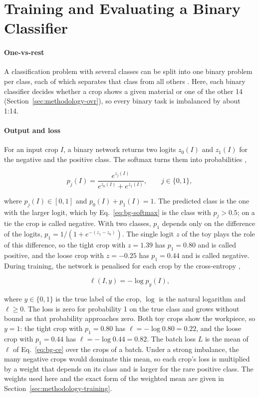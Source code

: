 \section{Training and Evaluating a Binary Classifier}
\label{sec:background-training}

\paragraph{One-vs-rest}
A classification problem with several classes can be split into one binary problem per
class, each of which separates that class from all others \citep{rifkin2004defense}.
Here, each binary classifier decides whether a crop shows a given material or one of the
other 14 (Section~\ref{sec:methodology-ovr}), so every binary task is imbalanced by
about 1:14.

\paragraph{Output and loss}
For an input crop $I$, a binary network returns two logits $z_0(I)$ and $z_1(I)$ for the
negative and the positive class. The softmax turns them into
probabilities \citep[Sec.~6.2.2.3]{goodfellow2016deep},

\begin{equation}
p_j(I) = \frac{e^{z_j(I)}}{e^{z_0(I)} + e^{z_1(I)}}, \qquad j \in \{0, 1\},
\label{eq:bg-softmax}
\end{equation}

where $p_j(I) \in [0,1]$ and $p_0(I) + p_1(I) = 1$. The predicted class is the one with
the larger logit, which by Eq.~\eqref{eq:bg-softmax} is the class with $p_j > 0.5$; on a
tie the crop is called negative. With two classes, $p_1$ depends only on the difference
of the logits, $p_1 = 1/(1 + e^{-(z_1 - z_0)})$. The single logit $z$ of the toy plays
the role of this difference, so the tight crop with $z = 1.39$ has $p_1 = 0.80$ and is
called positive, and the loose crop with $z = -0.25$ has $p_1 = 0.44$ and is called
negative. During training, the network is penalised for each crop by the
cross-entropy \citep[Sec.~6.2.1.1]{goodfellow2016deep},

\begin{equation}
\ell(I, y) = -\log p_y(I),
\label{eq:bg-ce}
\end{equation}

where $y \in \{0, 1\}$ is the true label of the crop, $\log$ is the natural logarithm and
$\ell \ge 0$. The loss is zero for probability 1 on the true class and grows without
bound as that probability approaches zero. Both toy crops show the workpiece, so
$y = 1$: the tight crop with $p_1 = 0.80$ has $\ell = -\log 0.80 = 0.22$, and the loose
crop with $p_1 = 0.44$ has $\ell = -\log 0.44 = 0.82$. The batch loss $L$ is the mean of $\ell$ of
Eq.~\eqref{eq:bg-ce} over the crops of a batch. Under a strong imbalance, the many
negative crops would dominate this mean, so each crop's loss is multiplied by a weight
that depends on its class and is larger for the rare positive class. The weights used
here and the exact form of the weighted mean are given in
Section~\ref{sec:methodology-training}.

